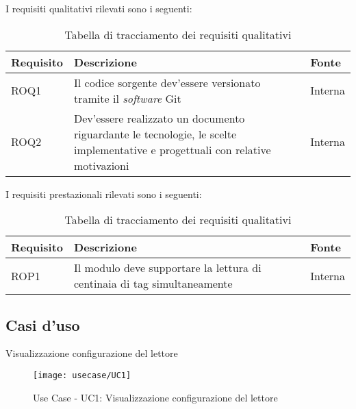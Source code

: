 I requisiti qualitativi rilevati sono i seguenti:
\begin{table}
    \label{tab:requisiti-qual}
    \begin{tabularx}{\textwidth}{ | X | X | X |}
    \hline
    \textbf{Requisito} & \textbf{Descrizione} & \textbf{Fonte}\\
    \hline
    ROQ1 & Il codice sorgente dev'essere versionato tramite il \emph{software} Git & Interna \\
    \hline
    ROQ2 & Dev'essere realizzato un documento riguardante le tecnologie, le scelte implementative e progettuali con relative motivazioni & Interna \\
    \hline
    \end{tabularx}
    \caption{Tabella di tracciamento dei requisiti qualitativi}
\end{table}

I requisiti prestazionali rilevati sono i seguenti:
\begin{table}
    \label{tab:requisiti-pre}
    \begin{tabularx}{\textwidth}{ | X | X | X |}
    \hline
    \textbf{Requisito} & \textbf{Descrizione} & \textbf{Fonte}\\
    \hline
    ROP1 & Il modulo deve supportare la lettura di centinaia di tag simultaneamente & Interna \\
    \hline
    \end{tabularx}
    \caption{Tabella di tracciamento dei requisiti qualitativi}
\end{table}


\subsection{Casi d'uso}
\label{sub-sec:use-case}

\begin{usecase}{1}{Visualizzazione configurazione del lettore}
\label{uc:1}
\end{usecase}

\begin{figure}[!h] 
    \centering 
    \texttt{[image: usecase/UC1]} 
    \caption{Use Case - UC1: Visualizzazione configurazione del lettore}
\end{figure}

